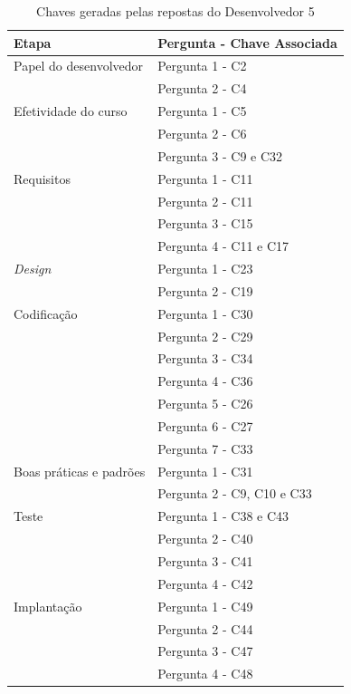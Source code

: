 \begin{table}[h]
	\centering
	\begin{tabular}{|m{4.8cm} | m{4.8cm} |}
		\hline
		\textbf{Etapa} & \textbf{Pergunta - Chave Associada} \\ \hline
		Papel do desenvolvedor & Pergunta 1 - C2 \\ \cline{2-2}
		& Pergunta 2 - C4 \\ \cline{2-2}
		\hline
		Efetividade do curso & Pergunta 1 - C5 \\ \cline{2-2}
		& Pergunta 2 - C6 \\ \cline{2-2}
		& Pergunta 3 - C9 e C32 \\ \cline{2-2}
		\hline
		Requisitos & Pergunta 1 - C11 \\ \cline{2-2}
		 & Pergunta 2 - C11 \\ \cline{2-2}
		& Pergunta 3 - C15 \\ \cline{2-2}
		& Pergunta 4 - C11 e C17 \\ \cline{2-2}
		\hline
		\textit{Design} & Pergunta 1 - C23 \\ \cline{2-2}
		& Pergunta 2 - C19 \\ \cline{2-2}
		\hline
		Codificação & Pergunta 1 - C30 \\ \cline{2-2}
		& Pergunta 2 - C29 \\ \cline{2-2}
		& Pergunta 3 - C34 \\ \cline{2-2}
		& Pergunta 4 - C36 \\ \cline{2-2}
		& Pergunta 5 - C26 \\ \cline{2-2}
		& Pergunta 6 - C27 \\ \cline{2-2}
		& Pergunta 7 - C33 \\ \cline{2-2} \hline
		Boas práticas e padrões & Pergunta 1 - C31 \\ \cline{2-2}
		& Pergunta 2 - C9, C10 e C33 \\ \cline{2-2}
		\hline
		Teste & Pergunta 1 - C38 e C43 \\ \cline{2-2}
		& Pergunta 2 - C40 \\ \cline{2-2}
		& Pergunta 3 - C41 \\ \cline{2-2}
		& Pergunta 4 - C42 \\ \cline{2-2}
		\hline
		Implantação & Pergunta 1 - C49 \\ \cline{2-2}
		& Pergunta 2 - C44 \\ \cline{2-2}
		& Pergunta 3 - C47 \\ \cline{2-2}
		& Pergunta 4 - C48 \\ \cline{2-2}
		\hline
	\end{tabular}

	\caption{Chaves geradas pelas repostas do Desenvolvedor 5}
	\label{tab07}
\end{table}

